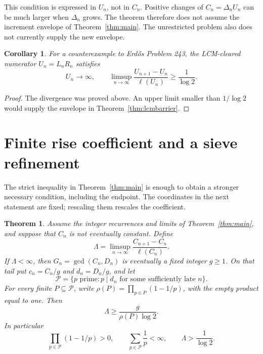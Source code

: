\documentclass[11pt]{article}
\newtheorem{theorem}{Theorem}
\newtheorem{corollary}{Corollary}
\newcommand{\ellog}{\ell}
\begin{document}
This condition is expressed in $U_n$, not in $C_n$. Positive changes of
$C_n=\Delta_nU_n$ can be much larger when $\Delta_n$ grows. The theorem
therefore does not assume the increment envelope of Theorem~\ref{thm:main}.
The unrestricted problem also does not currently supply the new envelope.

\begin{corollary}
For a counterexample to Erd\H{o}s Problem 243, the LCM-cleared numerator
$U_n=L_nR_n$ satisfies
\[
 U_n\longrightarrow\infty,\qquad
 \limsup_{n\to\infty}\frac{U_{n+1}-U_n}{\ellog(U_n)}\ge\frac1{\log2}.
\]
\end{corollary}
\begin{proof}
The divergence was proved above. An upper limit smaller than $1/\log2$
would supply the envelope in Theorem~\ref{thm:lcmbarrier}.
\end{proof}

\section{Finite rise coefficient and a sieve refinement}
The strict inequality in Theorem~\ref{thm:main} is enough to obtain a
stronger necessary condition, including the endpoint. The coordinates
in the next statement are fixed; rescaling them rescales the coefficient.

\begin{theorem}\label{thm:wheel}
Assume the integer recurrences and limits of Theorem~\ref{thm:main},
and suppose that $C_n$ is not eventually constant. Define
\[
 \Lambda=\limsup_{n\to\infty}
 \frac{C_{n+1}-C_n}{\ellog(C_n)}.
\]
If $\Lambda<\infty$, then $G_n=\gcd(C_n,D_n)$ is eventually a fixed
integer $g\ge1$. On that tail put $c_n=C_n/g$ and $d_n=D_n/g$, and let
\[
 \mathcal P=\{p\text{ prime}:p\mid d_n\text{ for some sufficiently late }n\}.
\]
For every finite $P\subseteq\mathcal P$, write
$\rho(P)=\prod_{p\in P}(1-1/p)$, with the empty product equal to one.
Then
\begin{equation}\label{eq:wheelbound}
 \Lambda\ge\frac{g}{\rho(P)\log2}.
\end{equation}
In particular
\[
 \prod_{p\in\mathcal P}(1-1/p)>0,\qquad
 \sum_{p\in\mathcal P}\frac1p<\infty,
 \qquad \Lambda>\frac1{\log2}.
\]
\end{theorem}
\end{document}
